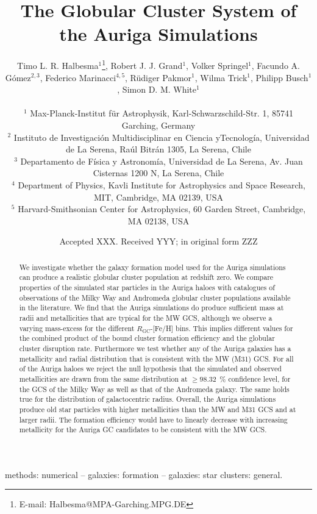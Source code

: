 \documentclass[a4paper,fleqn,usenatbib]{mnras}
\title[Auriga GCS]{The Globular Cluster System of the Auriga Simulations}
\author[T. L. R. Halbesma et al.]{\parbox[t]{\textwidth}{
    Timo L. R. Halbesma$^{1}$\thanks{E-mail: Halbesma@MPA-Garching.MPG.DE},
    Robert J. J. Grand$^{1}$,
    Volker Springel$^{1}$,
    Facundo A. G\'{o}mez$^{2,3}$,
    Federico Marinacci$^{4,5}$,
    R\"{u}diger Pakmor$^{1}$,
    Wilma Trick$^{1}$,
    Philipp Busch$^{1}$,
    Simon D. M. White$^{1}$
} \vspace{10pt} \\
$^{1}$ Max-Planck-Institut f\"ur Astrophysik, Karl-Schwarzschild-Str. 1,
    85741 Garching, Germany \\
$^{2}$ Instituto de Investigaci\'{o}n Multidisciplinar en Ciencia yTecnolog\'{i}a,
    Universidad de La Serena, Ra\'{u}l Bitr\'{a}n 1305, La Serena, Chile \\
$^{3}$ Departamento de F\'{i}sica y Astronom\'{i}a, Universidad de La Serena, Av.
    Juan Cisternas 1200 N, La Serena, Chile \\
$^{4}$ Department of Physics, Kavli Institute for Astrophysics and Space Research,
    MIT, Cambridge, MA 02139, USA \\
$^{5}$ Harvard-Smithsonian Center for Astrophysics, 60 Garden Street, Cambridge,
    MA 02138, USA \\
}
\date{Accepted XXX. Received YYY; in original form ZZZ}
\begin{document}
\label{firstpage}
\pagerange{\pageref{firstpage}--\pageref{lastpage}}
\maketitle

\begin{abstract}
We investigate whether the galaxy formation model used for the Auriga simulations
can produce a realistic globular cluster population at redshift zero. We compare
properties of the simulated star particles in the Auriga haloes with catalogues 
of observations of the Milky Way and Andromeda globular cluster populations available
in the literature. We find that the Auriga simulations do produce sufficient mass
at radii and metallicities that are typical for the MW GCS, although we observe
a varying mass-excess for the different $R_{\text{GC}}$-[Fe/H] bins. This implies
different values for the combined product of the bound cluster formation efficiency
and the globular cluster disruption rate. Furthermore we test whether any of the
Auriga galaxies has a metallicity and radial distribution that is consistent with
the MW (M31) GCS. For all of the Auriga haloes we reject the null hypothesis that
the simulated and observed metallicities are drawn from the same distribution at
$\geq98.32$~\% confidence level, for the GCS of the Milky Way as well as that of
the Andromeda galaxy. The same holds true for the distribution of galactocentric 
radius. Overall, the Auriga simulations produce old star particles with higher
metallicities than the MW and M31 GCS and at larger radii. The formation efficiency
would have to linearly decrease with increasing metallicity for the Auriga GC
candidates to be consistent with the MW GCS.
\end{abstract}

\begin{keywords}
methods: numerical -- galaxies: formation -- galaxies: star clusters: general.
\end{keywords}


\end{document}
